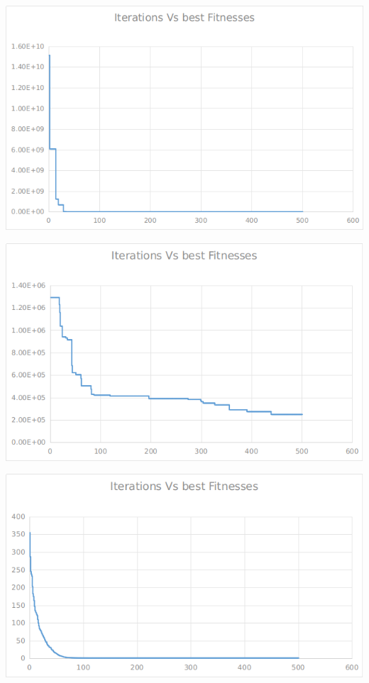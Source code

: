 \documentclass[12pt]{article}
\begin{document}
				\begin{minipage}{0.6\linewidth}
					\includegraphics[width=\linewidth]{3.png}
				\end{minipage}
				\hfill
				\begin{minipage}{0.6\linewidth}
					\includegraphics[width=\linewidth]{4.png}
				\end{minipage}
				\begin{minipage}{0.6\linewidth}
					\includegraphics[width=\linewidth]{5.png}
				\end{minipage}
\end{document}
